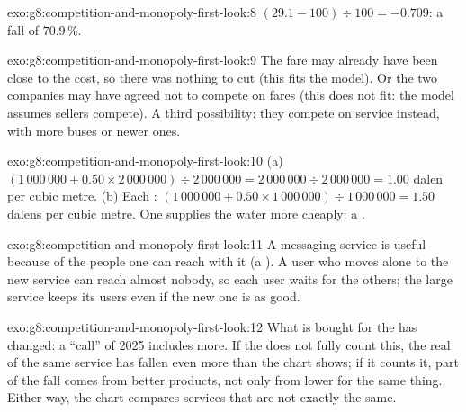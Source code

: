 \begin{solution}{exo:g8:competition-and-monopoly-first-look:8}
$(29.1 - 100) \div 100 = -0.709$: a fall of $70.9\,\%$.
\end{solution}

\begin{solution}{exo:g8:competition-and-monopoly-first-look:9}
The fare may already have been close to the cost, so there was nothing to cut (this fits the model).
Or the two companies may have agreed not to compete on fares (this does not fit: the model assumes
sellers compete). A third possibility: they compete on service instead, with more buses or newer ones.
\end{solution}

\begin{solution}{exo:g8:competition-and-monopoly-first-look:10}
(a) $(1\,000\,000 + 0.50 \times 2\,000\,000) \div 2\,000\,000 = 2\,000\,000 \div 2\,000\,000 = 1.00$
dalen per cubic metre. (b) Each : $(1\,000\,000 + 0.50 \times 1\,000\,000) \div 1\,000\,000 =
1.50$ dalens per cubic metre. One  supplies the water more cheaply: a .
\end{solution}

\begin{solution}{exo:g8:competition-and-monopoly-first-look:11}
A messaging service is useful because of the people one can reach with it (a ). A user who
moves alone to the new service can reach almost nobody, so each user waits for the others; the large
service keeps its users even if the new one is as good.
\end{solution}

\begin{solution}{exo:g8:competition-and-monopoly-first-look:12}
What is bought for the  has changed: a ``call'' of 2025 includes more. If the  does not
fully count this, the real  of the same service has fallen even more than the chart shows; if it
counts it, part of the fall comes from better products, not only from lower  for the same thing.
Either way, the chart compares services that are not exactly the same.
\end{solution}


